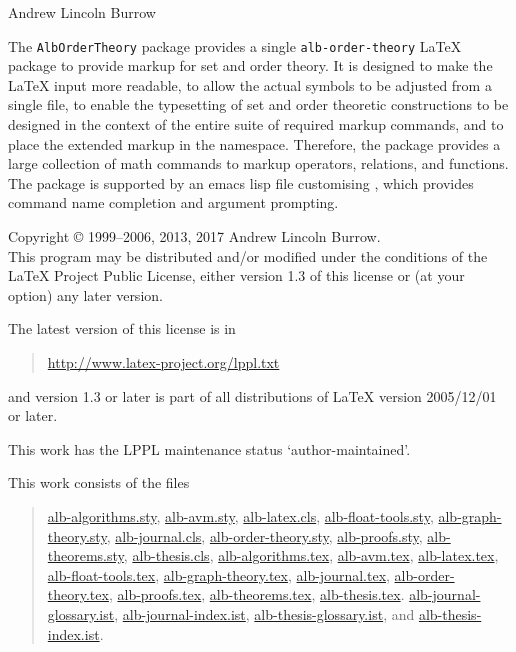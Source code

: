 \documentclass[11pt,a4paper,oneside]{alb-latex}
\begin{document}


\begin{albTitlePage}


  Andrew Lincoln Burrow


  The \texttt{AlbOrderTheory} package provides a single
  \texttt{alb-order-theory} \LaTeX{} package to provide markup for set
  and order theory.  It is designed to make the \LaTeX{} input more
  readable, to allow the actual symbols to be adjusted from a single
  file, to enable the typesetting of set and order theoretic
  constructions to be designed in the context of the entire suite of
  required markup commands, and to place the extended markup in the
  \albLogo{} namespace.  Therefore, the package provides a large
  collection of math commands to markup operators, relations, and
  functions.  The package is supported by an emacs lisp file customising
  \AUCTeX{}, which provides command name completion and argument
  prompting.



  Copyright \copyright{} 1999--2006, 2013, 2017 Andrew Lincoln Burrow.\\
  This program may be distributed and/or modified under the conditions
  of the \LaTeX{} Project Public License, either version 1.3 of this
  license or (at your option) any later version.

  \medskip{}

  The latest version of this license is in
  \begin{quote}
    \url{http://www.latex-project.org/lppl.txt}
  \end{quote}
  and version 1.3 or later is part of all distributions of LaTeX version
  2005/12/01 or later.

  \medskip{}

  This work has the LPPL maintenance status `author-maintained'.

  \medskip{}

  This work consists of the files
  \begin{quote}
    \begin{flushleft}
      \url{alb-algorithms.sty}, \url{alb-avm.sty}, \url{alb-latex.cls},
      \url{alb-float-tools.sty}, \url{alb-graph-theory.sty},
      \url{alb-journal.cls}, \url{alb-order-theory.sty},
      \url{alb-proofs.sty}, \url{alb-theorems.sty},
      \url{alb-thesis.cls}, \url{alb-algorithms.tex}, \url{alb-avm.tex},
      \url{alb-latex.tex}, \url{alb-float-tools.tex},
      \url{alb-graph-theory.tex}, \url{alb-journal.tex},
      \url{alb-order-theory.tex}, \url{alb-proofs.tex},
      \url{alb-theorems.tex}, \url{alb-thesis.tex}.
      \url{alb-journal-glossary.ist}, \url{alb-journal-index.ist},
      \url{alb-thesis-glossary.ist}, and \url{alb-thesis-index.ist}.
    \end{flushleft}
  \end{quote}



\end{albTitlePage}
\end{document}
